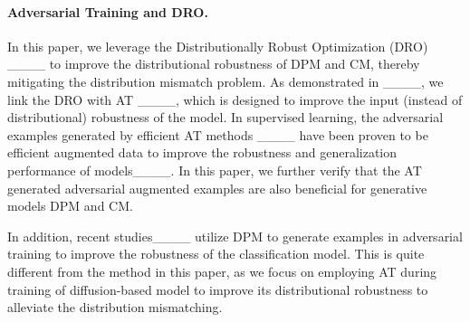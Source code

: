 \paragraph{Adversarial Training and DRO.} In this paper, we leverage the Distributionally Robust Optimization (DRO) ____ to improve the distributional robustness of DPM and CM, thereby mitigating the distribution mismatch problem. As demonstrated in ____, we link the DRO with AT ____, which is designed to improve the input (instead of distributional) robustness of the model. In supervised learning, the adversarial examples generated by efficient AT methods ____ have been proven to be efficient augmented data to improve the robustness and generalization performance of models____. In this paper, we further verify that the AT generated adversarial augmented examples are also beneficial for generative models DPM and CM.  

In addition, recent studies____ utilize DPM to generate examples in adversarial training to improve the robustness of the classification model. This is quite different from the method in this paper, as we focus on employing AT during training of diffusion-based model to improve its distributional robustness to alleviate the distribution mismatching. 

